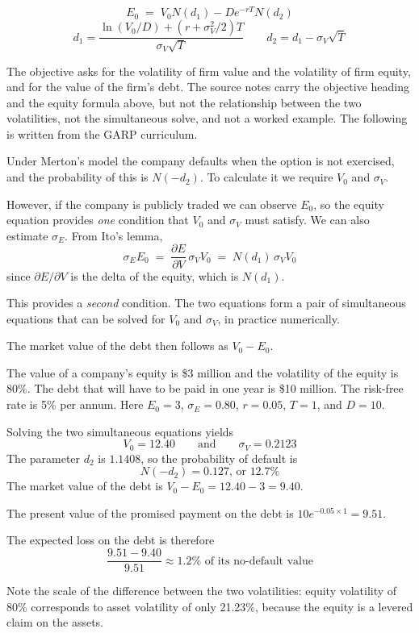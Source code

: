\begin{crfmlbox}
\[ E_0 \;=\; V_0 N(d_1) - D e^{-rT} N(d_2) \]
\[ d_1 = \frac{\ln(V_0/D) + (r + \sigma_V^{2}/2)T}{\sigma_V\sqrt{T}}
   \qquad d_2 = d_1 - \sigma_V\sqrt{T} \]
\end{crfmlbox}

\gapbadge

{\footnotesize\color{FRMGrey}The objective asks for the volatility of firm value
and the volatility of firm equity, and for the value of the firm's debt. The
source notes carry the objective heading and the equity formula above, but not
the relationship between the two volatilities, not the simultaneous solve, and not
a worked example. The following is written from the GARP curriculum.}

\begin{crgapbox}
Under Merton's model the company defaults when the option is not exercised, and
the probability of this is $N(-d_2)$. To calculate it we require $V_0$ and
$\sigma_V$. 

\smallskip
However, if the company is publicly traded we can observe $E_0$, so the equity
equation provides \emph{one} condition that $V_0$ and $\sigma_V$ must satisfy. We
can also estimate $\sigma_E$. From Ito's lemma,
\[ \sigma_E E_0 \;=\; \frac{\partial E}{\partial V}\,\sigma_V V_0
   \;=\; N(d_1)\,\sigma_V V_0 \]
since $\partial E/\partial V$ is the delta of the equity, which is $N(d_1)$.

\smallskip
This provides a \emph{second} condition. The two equations form a pair of
simultaneous equations that can be solved for $V_0$ and $\sigma_V$, in practice
numerically.

\smallskip
The market value of the debt then follows as $V_0 - E_0$.
\end{crgapbox}

\begin{crexbox}
The value of a company's equity is \$3 million and the volatility of the equity is
80\%. The debt that will have to be paid in one year is \$10 million. The
risk-free rate is 5\% per annum.
\tcblower
Here $E_0 = 3$, $\sigma_E = 0.80$, $r = 0.05$, $T = 1$, and $D = 10$.

\smallskip
Solving the two simultaneous equations yields
\[ V_0 = 12.40 \qquad\text{and}\qquad \sigma_V = 0.2123 \]
The parameter $d_2$ is $1.1408$, so the probability of default is
\[ N(-d_2) = 0.127 \text{, or } 12.7\% \]
The market value of the debt is $V_0 - E_0 = 12.40 - 3 = 9.40$.

The present value of the promised payment on the debt is
$10e^{-0.05\times1} = 9.51$.

The expected loss on the debt is therefore
\[ \frac{9.51 - 9.40}{9.51} \approx 1.2\% \text{ of its no-default value} \]

\smallskip
Note the scale of the difference between the two volatilities: equity volatility
of 80\% corresponds to asset volatility of only 21.23\%, because the equity is a
levered claim on the assets.
\end{crexbox}

